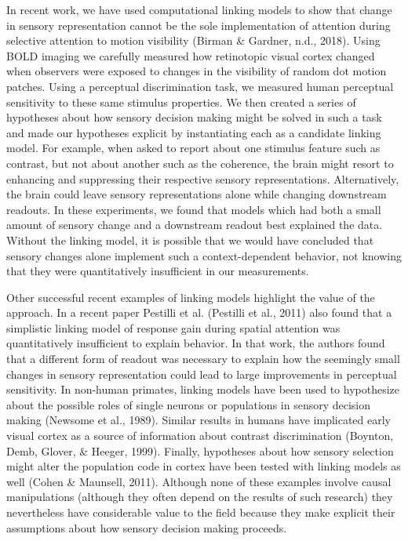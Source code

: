 \documentclass{report}
\begin{document}
In recent work, we have used computational linking models to show that change in sensory representation cannot be the sole implementation of attention during selective attention to motion visibility (Birman & Gardner, n.d., 2018). Using BOLD imaging we carefully measured how retinotopic visual cortex changed when observers were exposed to changes in the visibility of random dot motion patches. Using a perceptual discrimination task, we measured human perceptual sensitivity to these same stimulus properties. We then created a series of hypotheses about how sensory decision making might be solved in such a task and made our hypotheses explicit by instantiating each as a candidate linking model. For example, when asked to report about one stimulus feature such as contrast, but not about another such as the coherence, the brain might resort to enhancing and suppressing their respective sensory representations. Alternatively, the brain could leave sensory representations alone while changing downstream readouts. In these experiments, we found that models which had both a small amount of sensory change and a downstream readout best explained the data. Without the linking model, it is possible that we would have concluded that sensory changes alone implement such a context-dependent behavior, not knowing that they were quantitatively insufficient in our measurements.  

Other successful recent examples of linking models highlight the value of the approach. In a recent paper Pestilli et al. (Pestilli et al., 2011) also found that a simplistic linking model of response gain during spatial attention was quantitatively insufficient to explain behavior. In that work, the authors found that a different form of readout was necessary to explain how the seemingly small changes in sensory representation could lead to large improvements in perceptual sensitivity. In non-human primates, linking models have been used to hypothesize about the possible roles of single neurons or populations in sensory decision making (Newsome et al., 1989). Similar results in humans have implicated early visual cortex as a source of information about contrast discrimination (Boynton, Demb, Glover, & Heeger, 1999). Finally, hypotheses about how sensory selection might alter the population code in cortex have been tested with linking models as well (Cohen & Maunsell, 2011). Although none of these examples involve causal manipulations (although they often depend on the results of such research) they nevertheless have considerable value to the field because they make explicit their assumptions about how sensory decision making proceeds.
\end{document}
